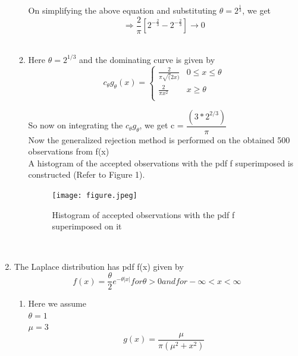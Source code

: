 \documentclass[letterpaper]{article}
\begin{document}
\begin{enumerate}
\begin{enumerate}
On simplifying the above equation and substituting $\theta = 2^{\frac{1}{3}}$, we get\\

\begin{equation*}
\Rightarrow\dfrac{2}{\pi}[2^{-\frac{2}{3}}-2^{-\frac{2}{3}}] \rightarrow 0
\end{equation*}\\


\item 
Here $\theta = 2^{1/3}$ and 
the dominating curve is given by\\
\begin{equation*}
c_{\theta} g_{\theta}(x)=
\begin{cases}
\frac{2}{\pi \sqrt(2x)} & 0 \leq x \leq \theta\\
\frac{2}{\pi x^2} & x \geq \theta\\
\end{cases}
\end{equation*}
 
 So now on integrating the $c_\theta g_\theta$, we get c = $\dfrac{(3*2^{2/3})}{\pi}$\\
 Now the generalized rejection method is performed on the obtained 500 observations from f(x)\\
 A histogram of the accepted observations with the pdf f superimposed is constructed (Refer to Figure 1).\\
 \begin{figure}[h]
    \centering
     \texttt{[image: figure.jpeg]}
      \caption{ Histogram of accepted observations with the pdf f superimposed on it }
        \label{Figure 1}
\end{figure}\\

\end{enumerate} 

\item   The Laplace distribution has pdf f(x) given by\\

\begin{equation*}
f(x) =\dfrac{\theta}{2}e^{-\theta |x|}  for \theta >0  and for  -\infty <x <\infty
\end{equation*}

\begin{enumerate}
\item Here we assume \\
$\theta =1$\\
$\mu =3 $\\
\begin{equation*}
g(x)=\dfrac{\mu}{\pi(\mu^2 + x^2)}
\end {equation*}\\


\end{enumerate}
\end{enumerate}
\end{document}
